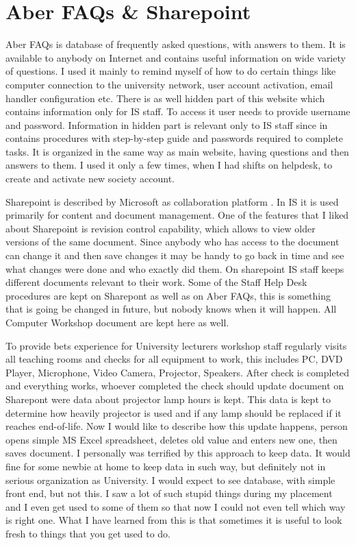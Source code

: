\documentclass[10pt,a4paper,headinclude=true]{report}
\begin{document}
\section{Aber FAQs \& Sharepoint}
\label{sec:faqs}
Aber FAQs is database of frequently asked questions, with answers to them. It is available to anybody on Internet and contains useful information on wide variety of questions. I used it mainly to remind myself of how to do certain things like computer connection to the university network, user account activation, email handler configuration etc. There is as well hidden part of this website which contains information only for IS staff. To access it user needs to provide username and password. Information in hidden part is relevant only to IS staff since in contains procedures with step-by-step guide and passwords required to complete tasks. It is organized in the same way as main website, having questions and then answers to them. I used it only a few times, when I had shifts on helpdesk, to create and activate new society account.

Sharepoint is described by Microsoft as collaboration platform \cite{Sharepoint}. In IS it is used primarily for content and document management. One of the features that I liked about Sharepoint is revision control capability, which allows to view older versions of the same document. Since anybody who has access to the document can change it and then save changes it may be handy to go back in time and see what changes were done and who exactly did them. On sharepoint IS staff keeps different documents relevant to their work. Some of the Staff Help Desk procedures are kept on Sharepont as well as on Aber FAQs, this is something that is going be changed in future, but nobody knows when it will happen. All Computer Workshop document are kept here as well. 

To provide bets experience for University lecturers workshop staff regularly visits all teaching rooms and checks for all equipment to work, this includes PC, DVD Player, Microphone, Video Camera, Projector, Speakers. After check is completed and everything works, whoever completed the check should update document on Sharepont were data about projector lamp hours is kept. This data is kept to determine how heavily projector is used and if any lamp should be replaced if it reaches end-of-life. Now I would like to describe how this update happens, person opens simple MS Excel spreadsheet, deletes old value and enters new one, then saves document. I personally was terrified by this approach to keep data. It would fine for some newbie at home to keep data in such way, but definitely not in serious organization as University. I would expect to see database, with simple front end, but not this. I saw a lot of such stupid things during my placement and I even get used to some of them so that now I could not even tell which way is right one. What I have learned from this is that sometimes it is useful to look fresh to things that you get used to do.      
\end{document}

